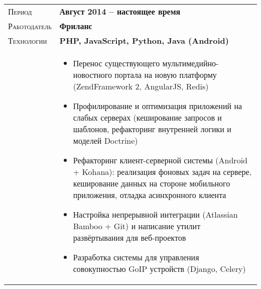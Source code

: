 \documentclass[a4paper, oneside, final]{scrartcl}
\newcommand{\gray}{\rowcolor[gray]{.90}}
\begin{document}
\begin{center}
\begin{tabularx}{0.97\linewidth}{>{\raggedleft\scshape}p{2.7cm}X}
    \gray Период & \textbf{Август 2014 -- настоящее время}\\
    \gray Работодатель & \textbf{Фриланс}\\
    \gray Технологии & \textbf{PHP, JavaScript, Python, Java (Android)}\\
    \center &
        \begin{itemize}
            \item Перенос существующего мультимедийно-новостного портала на
                новую платформу (ZendFramework 2, AngularJS, Redis)
            \item Профилирование и оптимизация приложений на слабых серверах
            (кеширование запросов и шаблонов, рефакторинг внутренней логики и
            моделей Doctrine)
            \item Рефакторинг клиент-серверной системы (Android + Kohana):
                реализация фоновых задач на сервере, кеширование данных на
                стороне мобильного приложения, отладка асинхронного клиента
            \item Настройка непрерывной интеграции (Atlassian Bamboo + Git) и
                написание утилит развёртывания для веб-проектов
            \item Разработка системы для управления совокупностью GoIP
                устройств (Django, Celery)
        \end{itemize}
\end{tabularx}

\vspace{6pt}


\end{center}
\end{document}
